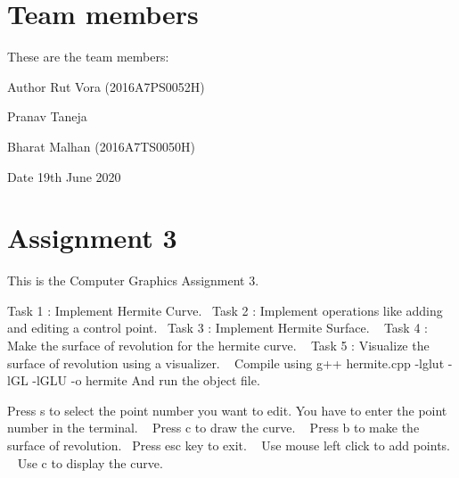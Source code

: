 \hypertarget{index_authors}{}\section{Team members}\label{index_authors}
These are the team members\+: \begin{DoxyAuthor}{Author}
Rut Vora (2016\+A7\+P\+S0052H) 

Pranav Taneja 

Bharat Malhan (2016\+A7\+T\+S0050H) 
\end{DoxyAuthor}
\begin{DoxyDate}{Date}
19th June 2020 
\end{DoxyDate}
\hypertarget{index_part1}{}\section{Assignment 3}\label{index_part1}
This is the Computer Graphics Assignment 3.

Task 1 \+: Implement Hermite Curve.~\newline
Task 2 \+: Implement operations like adding and editing a control point.~\newline
Task 3 \+: Implement Hermite Surface. ~\newline
Task 4 \+: Make the surface of revolution for the hermite curve. ~\newline
Task 5 \+: Visualize the surface of revolution using a visualizer. ~\newline
 Compile using g++ hermite.\+cpp -\/lglut -\/l\+GL -\/l\+G\+LU -\/o hermite And run the object file.

Press s to select the point number you want to edit. You have to enter the point number in the terminal. ~\newline
Press c to draw the curve. ~\newline
Press b to make the surface of revolution.~\newline
Press esc key to exit. ~\newline
Use mouse left click to add points. ~\newline
Use c to display the curve. ~\newline
